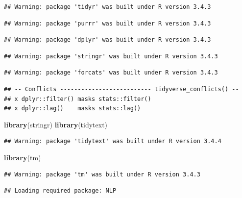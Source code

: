 \documentclass[]{article}
\newenvironment{Shaded}{\begin{snugshade}}{\end{snugshade}}
\newcommand{\KeywordTok}[1]{\textcolor[rgb]{0.13,0.29,0.53}{\textbf{#1}}}
\newcommand{\NormalTok}[1]{#1}
\begin{document}
\begin{verbatim}
## Warning: package 'tidyr' was built under R version 3.4.3
\end{verbatim}

\begin{verbatim}
## Warning: package 'purrr' was built under R version 3.4.3
\end{verbatim}

\begin{verbatim}
## Warning: package 'dplyr' was built under R version 3.4.3
\end{verbatim}

\begin{verbatim}
## Warning: package 'stringr' was built under R version 3.4.3
\end{verbatim}

\begin{verbatim}
## Warning: package 'forcats' was built under R version 3.4.3
\end{verbatim}

\begin{verbatim}
## -- Conflicts -------------------------- tidyverse_conflicts() --
## x dplyr::filter() masks stats::filter()
## x dplyr::lag()    masks stats::lag()
\end{verbatim}

\begin{Shaded}
\begin{Highlighting}[]
\KeywordTok{library}\NormalTok{(stringr)}
\KeywordTok{library}\NormalTok{(tidytext)}
\end{Highlighting}
\end{Shaded}

\begin{verbatim}
## Warning: package 'tidytext' was built under R version 3.4.4
\end{verbatim}

\begin{Shaded}
\begin{Highlighting}[]
\KeywordTok{library}\NormalTok{(tm)}
\end{Highlighting}
\end{Shaded}

\begin{verbatim}
## Warning: package 'tm' was built under R version 3.4.3
\end{verbatim}

\begin{verbatim}
## Loading required package: NLP
\end{verbatim}
\end{document}
